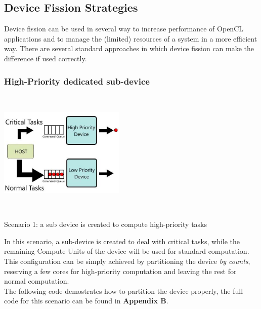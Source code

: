 \subsection{Device Fission Strategies}
Device fission can be used in several way to increase performance of OpenCL applications and to manage the (limited) resources of a system in a more efficient way. There are several standard approaches in which device fission can make the difference if used correctly.

\subsubsection{High-Priority dedicated sub-device} \label{sect:highPriority}
\begin{figurehere}
 \centering
 \includegraphics[width=6cm, height=6cm]{./eps/HighPriority.eps}
 \caption{Scenario 1: a sub device is created to compute high-priority tasks}
 \label{fig:highPriority}
\end{figurehere}

In this scenario, a sub-device is created to deal with critical tasks, while the remaining Compute Units of the device will be used for standard computation.
This configuration can be simply achieved by partitioning the device \textit{by counts}, reserving a few cores for high-priority computation and leaving the rest for normal computation.\\
The following code demostrates how to partition the device properly, the full code for this scenario can be found in \textbf{Appendix B}.


